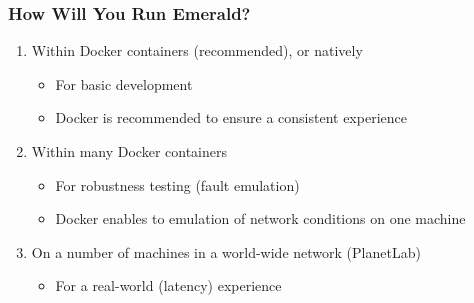 \begin{frame}

\frametitle{How Will You Run Emerald?}

\begin{enumerate}

\item Within Docker containers (recommended), or natively

\begin{itemize}

\footnotesize

\item For basic development

\item Docker is recommended to ensure a consistent experience

\end{itemize}

\item Within many Docker containers

\begin{itemize}

\footnotesize

\item For robustness testing (fault emulation)

\item Docker enables to emulation of network conditions on one machine

\end{itemize}

\item On a number of machines in a world-wide network (PlanetLab)

\begin{itemize}

\footnotesize

\item For a real-world (latency) experience

\end{itemize}

\end{enumerate}

\end{frame}
